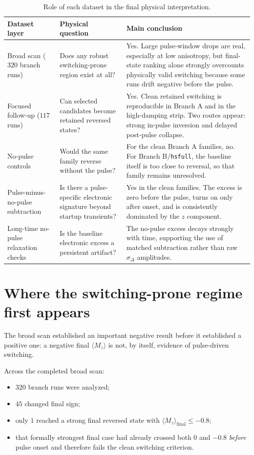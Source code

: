 \documentclass[11pt]{article}
\begin{document}
\begin{table}[H]
\centering
\caption{Role of each dataset in the final physical interpretation.}
\label{tab:picture}
\small
\begin{tabularx}{\textwidth}{>{\raggedright\arraybackslash}p{} >{\raggedright\arraybackslash}p{} Y}
\toprule
Dataset layer & Physical question & Main conclusion \\
\midrule
Broad scan (\(320\) branch runs) & Does any robust switching-prone region exist at all? & Yes. Large pulse-window drops are real, especially at low anisotropy, but final-state ranking alone strongly overcounts physically valid switching because some runs drift negative before the pulse. \\
Focused follow-up (\(117\) runs) & Can selected candidates become retained reversed states? & Yes. Clean retained switching is reproducible in Branch A and in the high-damping strip. Two routes appear: strong in-pulse inversion and delayed post-pulse collapse. \\
No-pulse controls & Would the same family reverse without the pulse? & For the clean Branch A families, no. For Branch B/\texttt{hsfull}, the baseline itself is too close to reversal, so that family remains unresolved. \\
Pulse-minus-no-pulse subtraction & Is there a pulse-specific electronic signature beyond startup transients? & Yes in the clean families. The excess is zero before the pulse, turns on only after onset, and is consistently dominated by the \(z\) component. \\
Long-time no-pulse relaxation checks & Is the baseline electronic excess a persistent artifact? & The no-pulse excess decays strongly with time, supporting the use of matched subtraction rather than raw \(\sigma_\Delta\) amplitudes. \\
\bottomrule
\end{tabularx}
\normalsize
\end{table}

\section{Where the switching-prone regime first appears}
The broad scan established an important negative result before it established a positive one: a negative final \(\langle M_z\rangle\) is not, by itself, evidence of pulse-driven switching.

Across the completed broad scan:
\begin{itemize}
\item \(320\) branch runs were analyzed;
\item \(45\) changed final sign;
\item only \(1\) reached a strong final reversed state with \(\langle M_z\rangle_{\mathrm{final}}\le -0.8\);
\item that formally strongest final case had already crossed both \(0\) and \(-0.8\) \emph{before} pulse onset and therefore fails the clean switching criterion.
\end{itemize}
\end{document}
